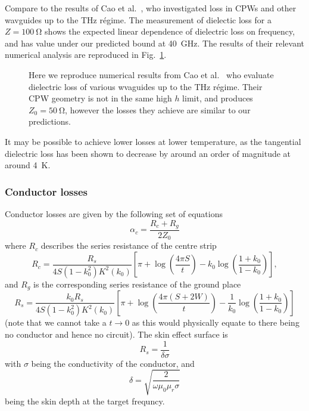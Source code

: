 Compare to the results of  Cao et al.~\cite{L.Cao2013}, who
investigated loss in CPWs and other wavguides up to the \si{\tera\hertz}
r\'egime. The measurement of dielectic loss for a $Z=\SI{100}{\ohm}$ shows the
expected linear dependence of dielectric loss on frequency, and has value under
our predicted bound at \SI{40}{\giga\hertz}. The results of their relevant
numerical analysis are reproduced in Fig.~\ref{fig:CaoFig9}.

\begin{figure}
  \caption{Here we reproduce numerical results from Cao et al.~\cite{L.Cao2013}
  who evaluate dielectric loss of various wvaguides up to the \si{\tera\hertz}
  r\'egime. Their CPW geometry is not in the same high $h$ limit, and produces
  $Z_0 = \SI{50}{\ohm}$, however the losses they achieve are similar to our
  predictions.
  }
  \label{fig:CaoFig9}
\end{figure}

It may be possible to achieve lower losses at lower temperature, as the
tangential dielectric loss has been shown to decrease by around an order of
magnitude at around \SI{4}{\kelvin}. \cite{1717770}

\subsubsection{Conductor losses}

Conductor losses are given by the following set of equations\cite{Simons2004}
\begin{equation}
  \alpha_c = \frac{R_c +R_g}{2Z_0}
\end{equation}
where $R_c$ describes the series resistance of the centre strip
\begin{equation}
  R_c = \frac{R_s}{4 S(1-k_0^2)K^2(k_0)}\left[ \pi + \log\left(\frac{4\pi
  S}{t}\right) - k_0\log\left(\frac{1+k_0}{1-k_0}\right) \right],
\end{equation}
and $R_g$ is the corresponding series resistance of the ground place
\begin{equation}
  R_s = \frac{k_0 R_s}{4S(1-k_0^2)K^2(k_0)}\left[\pi +
  \log\left(\frac{4\pi(S+2W)}{t}\right) -
  \frac{1}{k_0}\log\left(\frac{1+k_0}{1-k_0}\right)\right]
\end{equation}
(note that we cannot take a $t\to 0$ as this would physically equate to there
being no conductor and hence no circuit). The skin effect surface is
\begin{equation}
  R_s = \frac{1}{\delta\sigma}
\end{equation}
with $\sigma$ being the conductivity of the conductor, and
\begin{equation}
  \delta = \sqrt{\frac{2}{\omega\mu_0\mu_r\sigma}}
\end{equation}
being the skin depth at the target frequncy.

